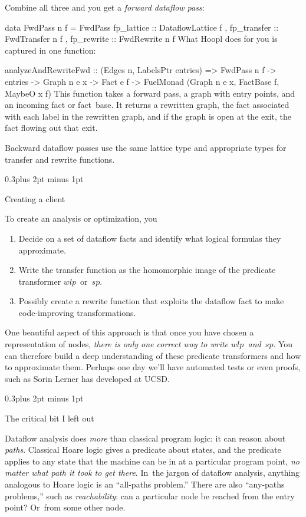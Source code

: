 \documentclass[twocolumn]{article}
\makeatletter
\newenvironment{code}{\par\unskip\kern-6pt \small\verbatim}{\endverbatim}
\newenvironment{smallcode}{\par\unskip\footnotesize\verbatim}{\endverbatim}
\newcommand\mysection[1]{%
  \par
  \vskip 0.5\baselineskip plus 2pt minus 1pt
  \noindent{\raggedright\textbf{#1}}
  \par
  \vskip 0.3\baselineskip plus 2pt minus 1pt
  \@afterindentfalse
}
\renewcommand\wp{\ensuremath{\mathit{wlp}}}
\renewcommand\sp{\ensuremath{\mathit{sp}}}
\renewcommand\mysection[1]{%
  \@startsection{section}{1}{\z@}{-0.5\baselineskip plus -2pt minus -1pt}%
                                   {0.3\baselineskip plus 2pt minus 1pt}%
           {\normalfont\raggedright\bfseries}}
\makeatother
\begin{document}
Combine all three and you get a \emph{forward dataflow pass}:
\begin{code}
data FwdPass n f
  = FwdPass { fp_lattice  :: DataflowLattice f
            , fp_transfer :: FwdTransfer n f
            , fp_rewrite  :: FwdRewrite n f }
\end{code}
What Hoopl does for you is captured in one function:
\begin{smallcode}
analyzeAndRewriteFwd
   :: (Edges n, LabelsPtr entries)
   => FwdPass n f
   -> entries
   -> Graph n e x 
   -> Fact e f
   -> FuelMonad (Graph n e x, FactBase f, MaybeO x f)
\end{smallcode}
This function takes a forward pass, a graph with entry points,
and an incoming fact or fact~base.
It returns a rewritten graph, the fact associated with each label in
the rewritten graph, and if the graph is open at the exit, the fact
flowing out that exit.

Backward dataflow passes use the same lattice type and appropriate
types for transfer and rewrite functions.

\mysection*{Creating a client}

To create an analysis or optimization, you
\begin{enumerate} 
\item
Decide on a set of dataflow facts and identify what logical formulas
they approximate.
\item
Write the transfer function as the homomorphic image of the predicate
 transformer  \wp~or~\sp.
\item
Possibly create a rewrite function that exploits the dataflow fact to
make code-improving transformations.
\end{enumerate}
One beautiful aspect of this approach is that once you have chosen
a representation of nodes, \emph{there is only one correct way to
  write \wp~and~\sp}.  
You can therefore build a deep understanding of these predicate
transformers and how to approximate them.
Perhaps one day we'll have automated tests or even proofs, such as
Sorin Lerner has developed at UCSD.

\mysection*{The critical bit I left out}

Dataflow analysis does \emph{more} than classical program logic:
it can reason about \emph{paths}.
Classical Hoare logic gives a predicate about states, and the
predicate applies to any state that the machine can be in at a
particular program point, \emph{no matter what path it took to get
  there}.
In~the jargon of dataflow analysis, anything analogous to Hoare logic
is an ``all-paths problem.''
There are also ``any-paths problems,'' such as \emph{reachability}:
can a particular node be reached from the entry point?  Or~from some
other node.
\end{document}
